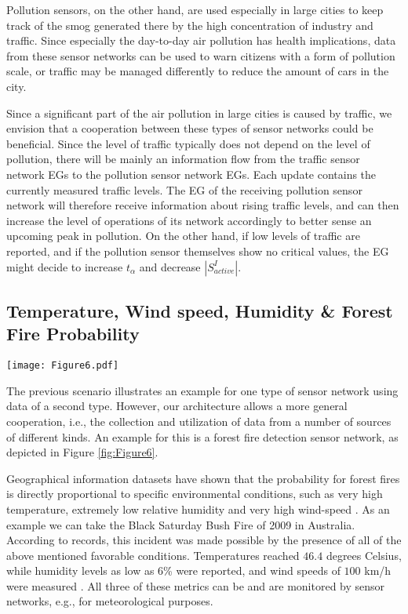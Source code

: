 \documentclass[onecolumn]{jaise2e}
\begin{document}
Pollution sensors, on the other hand, are used especially in large cities to keep track of the smog generated there by the high concentration of industry and traffic. Since especially the day-to-day air pollution has health implications, data from these sensor networks can be used to warn citizens with a form of pollution scale, or traffic may be managed differently to reduce the amount of cars in the city. 

Since a significant part of the air pollution in large cities is caused by traffic, we envision that a cooperation between these types of sensor networks could be beneficial. Since the level of traffic typically does not depend on the level of pollution, there will be mainly an information flow from the traffic sensor network EGs to the pollution sensor network EGs. Each update contains the currently measured traffic levels. The EG of the receiving pollution sensor network will therefore receive information about rising traffic levels, and can then increase the level of operations of its network accordingly to better sense an upcoming peak in pollution. On the other hand, if low levels of traffic are reported, and if the pollution sensor themselves show no critical values, the EG might decide to increase $t_\alpha$ and decrease $|S^I_{active}|$.
 

\subsection{Temperature, Wind speed, Humidity \& Forest Fire Probability}

\begin{figure*}[t]
\centering
\texttt{[image: Figure6.pdf]} 
\caption{Temperature, Wind speed, Humidity \& Forest Fire Probability}
\label{fig:Figure6}
\end{figure*}

The previous scenario illustrates an example for one type of sensor network using data of a second type. However, our architecture allows a more general cooperation, i.e., the collection and utilization of data from a number of sources of different kinds. An example for this is a forest fire detection sensor network, as depicted in Figure \ref{fig:Figure6}.

Geographical information datasets have shown that the probability for forest fires is directly proportional to specific environmental conditions, such as very high temperature, extremely low relative humidity and very high wind-speed \cite{ref-journal15}. As an example we can take the Black Saturday Bush Fire of 2009 in Australia. According to records, this incident was made possible by the presence of all of the above mentioned favorable conditions. Temperatures reached $46.4$ degrees Celsius, while humidity levels as low as $6$\% were reported, and wind speeds of $100$ km/h were measured \cite{ref-journal14}. All three of these metrics can be and are monitored by sensor networks, e.g., for meteorological purposes.
\end{document}
